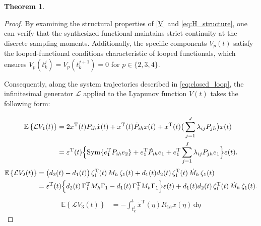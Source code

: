 \documentclass[preprint,review,fleqn,sort&compress,3p]{elsarticle}
\theoremstyle{definition} %
\theoremstyle{definition}%
\newtheorem{thm}{Theorem}[section]
\begin{document}
\begin{thm}
\begin{proof}
By examining the structural properties of \eqref{V} and \eqref{eq:H_structure}, one can verify that the synthesized functional maintains strict continuity at the discrete sampling moments. Additionally, the specific components $V_p(t)$ satisfy the looped-functional conditions characteristic of looped functionals, which ensures $V_p(t_k^j) = V_p(t_k^{j+1}) = 0$ for $p \in \{2, 3, 4\}$.

Consequently, along the system trajectories described in \eqref{eq:closed_loop}, the infinitesimal generator $\mathcal{L}$ applied to the Lyapunov function $V(t)$ takes the following form:

\begin{align}\label{EV1}
	\mathbb{E} \left\{ \mathcal{L}V_{1}(t) \right\}
	&= 2x^{\mathrm{T}}(t)P_{ih}\dot{x}(t) 
	+ x^{\mathrm{T}}(t)\dot{P}_{ih}x(t) 
	+ x^{\mathrm{T}}(t) \big( \sum_{j=1}^J \lambda_{ij}P_{jh} \big) x(t) \nonumber \\
	&= \varepsilon^{\mathrm{T}}(t) \Bigl\{ \mathrm{Sym}\{
	e_1^{\mathrm{T}}P_{ih}e_2\} + e_1^{\mathrm{T}}\dot{P}_{ih}e_1 
	+ e_1^{\mathrm{T}} \sum_{j=1}^J \lambda_{ij}P_{jh}e_1 \Bigl\} \varepsilon(t).
\end{align}
\begin{align}
	\mathbb{E} \left\{ \mathcal{L}V_{2}(t) \right\}
	&= \bigl(d_2(t) - d_1(t)\bigr) \, \zeta_1^{\mathrm{T}}(t) \, M_{h} \, \zeta_1(t) + d_1(t)d_2(t) \, \zeta_1^{\mathrm{T}}(t) \, \dot{M}_{h} \, \zeta_1(t) \nonumber \\
	&= \varepsilon^{\mathrm{T}}(t)
	\Bigl\{ d_2(t)\,\Gamma_{1}^{\mathrm{T}} M_{h} \Gamma_{1}
	- d_1(t)\,\Gamma_{1}^{\mathrm{T}} M_{h} \Gamma_{1} \Bigr\} \varepsilon(t)
	+ d_1(t)d_2(t) \, \zeta_1^{\mathrm{T}}(t) \, \dot{M}_{h} \, \zeta_1(t).
\end{align}
\begin{align}
	 \mathbb{E} \left\{ \mathcal{L}V_{3}(t) \right\} 
	&= - \int_{t_k^j}^{t} \dot{x}^\mathrm{T}(\eta) R_{1h} \dot{x}(\eta) \,\mathrm{d}\eta 

\end{align}
\end{proof}
\end{thm}
\end{document}
